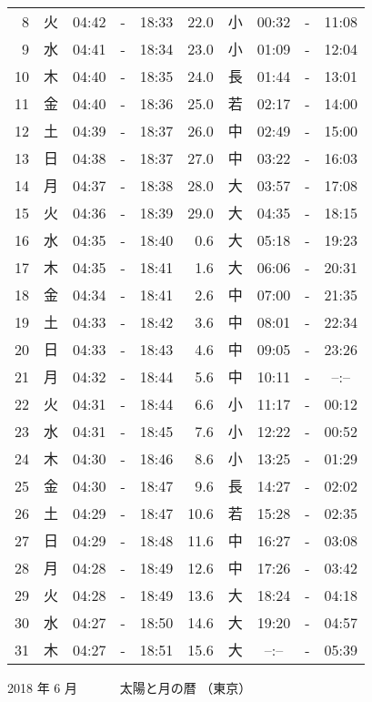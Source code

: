 \documentclass[a4j,10pt]{jsarticle}
\begin{document}
\begin{center}
\begin{table}[ht]
\begin{center}
\begin{tabular}{|rc|ccc|rc|ccc|}
  8 & 火 & 04:42 &-& 18:33 & 22.0 & 小 & 00:32 &-& 11:08 \\
  9 & 水 & 04:41 &-& 18:34 & 23.0 & 小 & 01:09 &-& 12:04 \\
 10 & 木 & 04:40 &-& 18:35 & 24.0 & 長 & 01:44 &-& 13:01 \\
 11 & 金 & 04:40 &-& 18:36 & 25.0 & 若 & 02:17 &-& 14:00 \\
 12 & 土 & 04:39 &-& 18:37 & 26.0 & 中 & 02:49 &-& 15:00 \\
 13 & 日 & 04:38 &-& 18:37 & 27.0 & 中 & 03:22 &-& 16:03 \\
 14 & 月 & 04:37 &-& 18:38 & 28.0 & 大 & 03:57 &-& 17:08 \\
 15 & 火 & 04:36 &-& 18:39 & 29.0 & 大 & 04:35 &-& 18:15 \\
 16 & 水 & 04:35 &-& 18:40 &  0.6 & 大 & 05:18 &-& 19:23 \\
 17 & 木 & 04:35 &-& 18:41 &  1.6 & 大 & 06:06 &-& 20:31 \\
 18 & 金 & 04:34 &-& 18:41 &  2.6 & 中 & 07:00 &-& 21:35 \\
 19 & 土 & 04:33 &-& 18:42 &  3.6 & 中 & 08:01 &-& 22:34 \\
 20 & 日 & 04:33 &-& 18:43 &  4.6 & 中 & 09:05 &-& 23:26 \\
 21 & 月 & 04:32 &-& 18:44 &  5.6 & 中 & 10:11 &-& --:-- \\
 22 & 火 & 04:31 &-& 18:44 &  6.6 & 小 & 11:17 &-& 00:12 \\
 23 & 水 & 04:31 &-& 18:45 &  7.6 & 小 & 12:22 &-& 00:52 \\
 24 & 木 & 04:30 &-& 18:46 &  8.6 & 小 & 13:25 &-& 01:29 \\
 25 & 金 & 04:30 &-& 18:47 &  9.6 & 長 & 14:27 &-& 02:02 \\
 26 & 土 & 04:29 &-& 18:47 & 10.6 & 若 & 15:28 &-& 02:35 \\
 27 & 日 & 04:29 &-& 18:48 & 11.6 & 中 & 16:27 &-& 03:08 \\
 28 & 月 & 04:28 &-& 18:49 & 12.6 & 中 & 17:26 &-& 03:42 \\
 29 & 火 & 04:28 &-& 18:49 & 13.6 & 大 & 18:24 &-& 04:18 \\
 30 & 水 & 04:27 &-& 18:50 & 14.6 & 大 & 19:20 &-& 04:57 \\
 31 & 木 & 04:27 &-& 18:51 & 15.6 & 大 & --:-- &-& 05:39 \\
\hline
\end{tabular}
\end{center}
\end{table}
\newpage
{\large 2018 年  6 月}
{\Large 　　　太陽と月の暦   （東京） }

\end{center}
\end{document}
